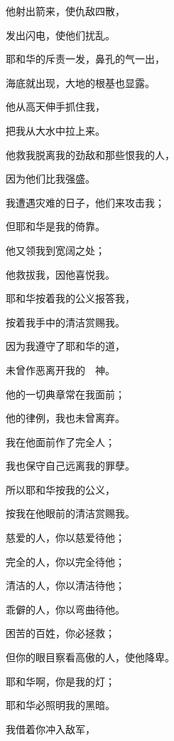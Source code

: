 {\par }{\Q {}他射出箭来，使仇敌四散，
\par }{\Q 发出闪电，使他们扰乱。
\par }{\Q {}耶和华的斥责一发，鼻孔的气一出，
\par }{\Q 海底就出现，大地的根基也显露。
\par }{\BB \par }{\Q {}他从高天伸手抓住我，
\par }{\Q 把我从大水中拉上来。
\par }{\Q {}他救我脱离我的劲敌和那些恨我的人，
\par }{\Q 因为他们比我强盛。
\par }{\Q {}我遭遇灾难的日子，他们来攻击我；
\par }{\Q 但耶和华是我的倚靠。
\par }{\Q {}他又领我到宽阔之处；
\par }{\Q 他救拔我，因他喜悦我。
\par }{\BB \par }{\Q {}耶和华按着我的公义报答我，
\par }{\Q 按着我手中的清洁赏赐我。
\par }{\Q {}因为我遵守了耶和华的道，
\par }{\Q 未曾作恶离开我的　神。
\par }{\BB \par }{\Q {}他的一切典章常在我面前；
\par }{\Q 他的律例，我也未曾离弃。
\par }{\Q {}我在他面前作了完全人；
\par }{\Q 我也保守自己远离我的罪孽。
\par }{\Q {}所以耶和华按我的公义，
\par }{\Q 按我在他眼前的清洁赏赐我。
\par }{\BB \par }{\Q {}慈爱的人，你以慈爱待他；
\par }{\Q 完全的人，你以完全待他；
\par }{\Q {}清洁的人，你以清洁待他；
\par }{\Q 乖僻的人，你以弯曲待他。
\par }{\Q {}困苦的百姓，你必拯救；
\par }{\Q 但你的眼目察看高傲的人，使他降卑。
\par }{\Q {}耶和华啊，你是我的灯；
\par }{\Q 耶和华必照明我的黑暗。
\par }{\Q {}我借着你冲入敌军，
}
